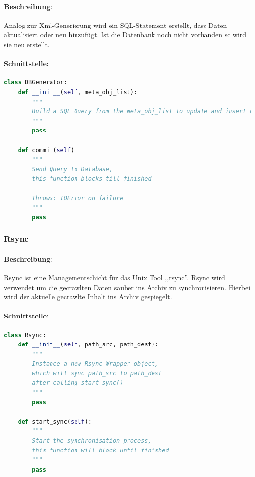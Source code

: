 \paragraph{Beschreibung:}
\label{par:beschreibung_}
Analog zur Xml-Generierung wird ein SQL-Statement erstellt, dass Daten aktualisiert oder neu hinzufügt.
Ist die Datenbank noch nicht vorhanden so wird sie neu erstellt.

\paragraph{Schnittstelle:}
\label{par:schnittstelle_}
\begin{lstlisting}[language=python]
class DBGenerator:
    def __init__(self, meta_obj_list):
        """
        Build a SQL Query from the meta_obj_list to update and insert new items the Database 
        """
        pass

    def commit(self):
        """
        Send Query to Database,
        this function blocks till finished

        Throws: IOError on failure
        """
        pass
\end{lstlisting}


\subsubsection{Rsync}
\label{ssub:rsync}
\paragraph{Beschreibung:}
\label{par:beschreibung_}
Rsync ist eine Managementschicht für das Unix Tool ,,rsync''. Rsync wird verwendet um die gecrawlten Daten sauber ins Archiv zu synchronisieren.
Hierbei wird der aktuelle gecrawlte Inhalt ins Archiv gespiegelt. 

\paragraph{Schnittstelle:}
\label{par:schnittstelle_}
\begin{lstlisting}[language=python]
class Rsync:
    def __init__(self, path_src, path_dest):
        """
        Instance a new Rsync-Wrapper object,
        which will sync path_src to path_dest
        after calling start_sync() 
        """
        pass

    def start_sync(self):
        """
        Start the synchronisation process,
        this function will block until finished
        """
        pass
\end{lstlisting}

